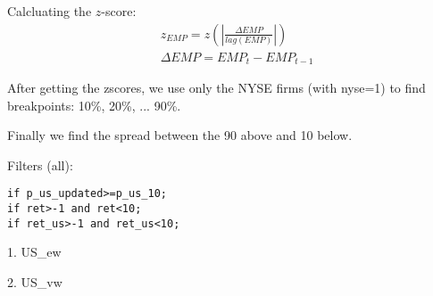

\usepackage[T1]{fontenc}




\thispagestyle{fancy}

\newcommand{\code}{\texttt}
\newcommand*{\Commonpath}{20190124/zEMP}






Calcluating the $z$-score:
$$
\begin{aligned}
& z_{EMP} = z(|\frac{\Delta EMP}{lag(EMP)}|) \\
& \Delta EMP = EMP_t - EMP_{t-1}
\end{aligned}
$$


After getting the zscores, we use only the NYSE firms (with nyse=1) to find breakpoints: 10\%, 20\%, ... 90\%.

Finally we find the spread between the 90 above and 10 below.

Filters (all):

\code{if p\_us\_updated>=p\_us\_10;} \\
\code{if ret>-1 and ret<10;} \\
\code{if ret\_us>-1 and ret\_us<10;} \\


\small

1. US\_ew


2. US\_vw


% 

% 

% 

% 

% 

% 


